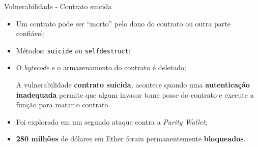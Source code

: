 

\begin{frame}{Vulnerabilidade - Contrato suicida}
    \begin{itemize}
        \item Um contrato pode ser ``morto'' pelo dono do contrato ou outra parte confiável;
        \item Métodos: \texttt{suicide} ou \texttt{selfdestruct};
        \item O \textit{bytecode} e o armazenamento do contrato é deletado;
        \begin{block}{}
        A vulnerabilidade \textbf{contrato suicida}, acontece quando uma \textbf{autenticação inadequada} permite que algum invasor tome posse do contrato e execute a função para matar o contrato.
        \end{block}
        \item Foi explorada em um segundo ataque contra a \textit{Parity Wallet};
        \item \textbf{280 milhões} de dólares em Ether foram permanentemente \textbf{bloqueados}.
    \end{itemize}
\end{frame}

